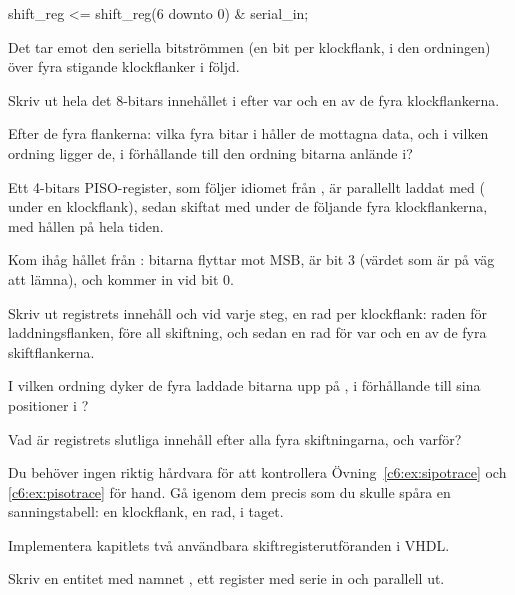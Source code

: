 \begin{vhdlcode}
shift_reg <= shift_reg(6 downto 0) & serial_in;
\end{vhdlcode}

Det tar emot den seriella bitströmmen  (en bit per klockflank, i den ordningen)
över fyra stigande klockflanker i följd.

 Skriv ut hela det 8-bitars innehållet i  efter var och en av de fyra
klockflankerna.

 Efter de fyra flankerna: vilka fyra bitar i  håller de mottagna data, och
i vilken ordning ligger de, i förhållande till den ordning bitarna anlände i?

\label{c6:ex:pisotrace}
Ett 4-bitars PISO-register, som följer idiomet från , är parallellt laddat med
 ( under en klockflank), sedan skiftat med
 under de följande fyra klockflankerna, med  hållen på 
hela tiden.

Kom ihåg hållet från : bitarna flyttar mot MSB,  är bit 3
(värdet som är på väg att lämna), och  kommer in vid bit 0.

 Skriv ut registrets innehåll och  vid varje steg, en rad per klockflank:
raden för laddningsflanken, före all skiftning, och sedan en rad för var och en av de fyra
skiftflankerna.

 I vilken ordning dyker de fyra laddade bitarna upp på , i förhållande
till sina positioner i ?

 Vad är registrets slutliga innehåll efter alla fyra skiftningarna, och varför?

\note[Tips]Du behöver ingen riktig hårdvara för att kontrollera Övning~\ref{c6:ex:sipotrace} och
\ref{c6:ex:pisotrace} för hand. Gå igenom dem precis som du skulle spåra en sanningstabell: en
klockflank, en rad, i taget.

\label{c6:ex:shiftregs}
Implementera kapitlets två användbara skiftregisterutföranden i VHDL.

 Skriv en entitet med namnet , ett register med serie
in och parallell ut.

